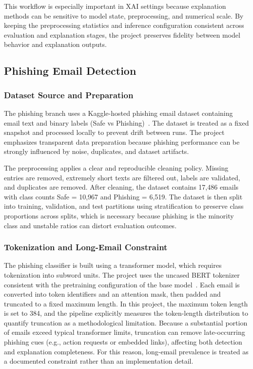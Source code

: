 \documentclass[conference]{IEEEtran}
\begin{document}
This workflow is especially important in XAI settings because explanation methods can be sensitive to model state, preprocessing, and numerical scale. By keeping the preprocessing statistics and inference configuration consistent across evaluation and explanation stages, the project preserves fidelity between model behavior and explanation outputs.

\subsection{Phishing Email Detection}

\subsubsection{Dataset Source and Preparation}

The phishing branch uses a Kaggle-hosted phishing email dataset containing email text and binary labels (Safe vs Phishing)~\cite{phishingDT}. The dataset is treated as a fixed snapshot and processed locally to prevent drift between runs. The project emphasizes transparent data preparation because phishing performance can be strongly influenced by noise, duplicates, and dataset artifacts.

The preprocessing applies a clear and reproducible cleaning policy. Missing entries are removed, extremely short texts are filtered out, labels are validated, and duplicates are removed. After cleaning, the dataset contains 17,486 emails with class counts Safe = 10,967 and Phishing = 6,519. The dataset is then split into training, validation, and test partitions using stratification to preserve class proportions across splits, which is necessary because phishing is the minority class and unstable ratios can distort evaluation outcomes.

\subsubsection{Tokenization and Long-Email Constraint}

The phishing classifier is built using a transformer model, which requires tokenization into subword units. The project uses the uncased BERT tokenizer consistent with the pretraining configuration of the base model~\cite{JMKK2019}. Each email is converted into token identifiers and an attention mask, then padded and truncated to a fixed maximum length. In this project, the maximum token length is set to 384, and the pipeline explicitly measures the token-length distribution to quantify truncation as a methodological limitation. Because a substantial portion of emails exceed typical transformer limits, truncation can remove late-occurring phishing cues (e.g., action requests or embedded links), affecting both detection and explanation completeness. For this reason, long-email prevalence is treated as a documented constraint rather than an implementation detail.
\end{document}
